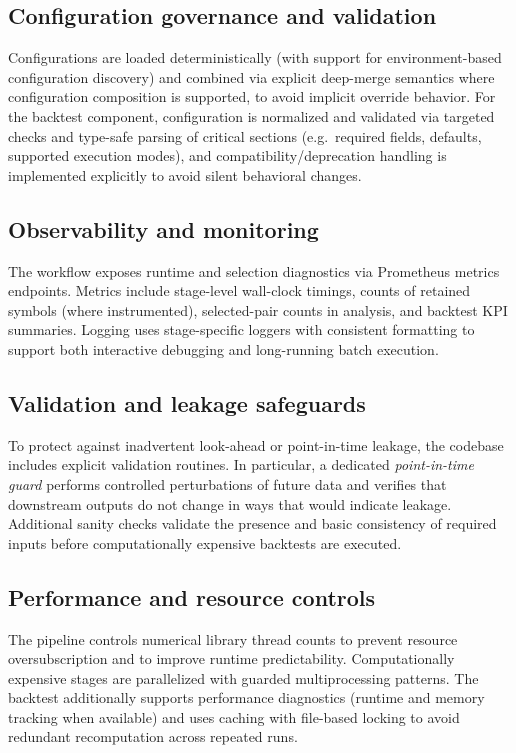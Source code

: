 \documentclass[11pt,a4paper]{article}
\begin{document}
\subsection*{Configuration governance and validation}
Configurations are loaded deterministically (with support for environment-based
configuration discovery) and combined via explicit deep-merge semantics where
configuration composition is supported, to avoid implicit override behavior.
For the backtest component, configuration is normalized and validated via
targeted checks and type-safe parsing of critical sections (e.g.\ required
fields, defaults, supported execution modes), and compatibility/deprecation
handling is implemented explicitly to avoid silent behavioral changes.

\subsection*{Observability and monitoring}
The workflow exposes runtime and selection diagnostics via Prometheus metrics
endpoints. Metrics include stage-level wall-clock timings, counts of retained
symbols (where instrumented), selected-pair counts in analysis, and backtest
KPI summaries. Logging uses stage-specific loggers with consistent formatting to
support both interactive debugging and long-running batch execution.

\subsection*{Validation and leakage safeguards}
To protect against inadvertent look-ahead or point-in-time leakage, the
codebase includes explicit validation routines. In particular, a dedicated
\emph{point-in-time guard} performs controlled perturbations of future data and
verifies that downstream outputs do not change in ways that would indicate
leakage. Additional sanity checks validate the presence and basic consistency
of required inputs before computationally expensive backtests are executed.

\subsection*{Performance and resource controls}
The pipeline controls numerical library thread counts to prevent resource
oversubscription and to improve runtime predictability. Computationally
expensive stages are parallelized with guarded multiprocessing patterns. The
backtest additionally supports performance diagnostics (runtime and memory
tracking when available) and uses caching with file-based locking to avoid
redundant recomputation across repeated runs.
\end{document}
